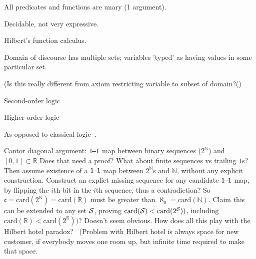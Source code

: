 All predicates and functions are unary 
(1 argument).~\cite{wiki:Monadic_predicate_calculus}

Decidable, not very expressive.

\label{sec:Many_sorted_first_order_models}

Hilbert's function calculus.~\cite{sep:logic_firstorder_emergence}

Domain of discourse has multiple sets;
variables 'typed' as having values in some particular 
set.~\cite{sep:modeltheory_fo}

(Is this really different from
axiom restricting variable to subset of domain?()


\label{sec:Second_order_logic}

Second-order logic~\cite{wiki:Second_order_logic,
wiki:Second_order_propositional_logic}

\label{sec:Higher_order_logic}

Higher-order logic~\cite{wiki:Higher_order_logic}


\setcounter{currentlevel}{\value{baseSectionLevel}}
\label{sec:Constructivism}

\cite{Feferman:2000,Diez:2002,sep:mathematics_constructive,
wiki:Constructivism_philosophy_of_mathematics}

As opposed to classical logic~\cite{wiki:Classical_logic}.

\label{sec:Feferman}
\cite{Feferman:2000}

\label{sec:Is_Cantor_Necessary}
\cite{Feferman1989CantorNecessary}

Cantor diagonal argument:
\hfill\break
$1{\!}{-}{\!}1$ map between binary sequences ($2^{\mathbb{N}}$)
and $[0,1]\subset\mathbb{R}$
Does that need a proof?
What about finite sequences vs trailing $1$s? 
\hfill\break
Then assume existence of a $1{\!}{-}{\!}1$  
map between $2^{\mathbb{N}}$s 
and $\mathbb{N}$,
without any explicit construction.
Construct an explict missing sequence 
for any candidate $1{\!}{-}{\!}1$ map,
by flipping the $i$th bit in the $i$th sequence,
thus a contradiction?
So $\mathfrak{c} = \mathrm{card}(2^{\mathbb{N}}) 
= \mathrm{card}(\mathbb{R})$ must be greater than 
$\aleph_0 = \mathrm{card}(\mathbb{N})$. 
\hfill\break
Claim this can be extended to any set $\mathcal{S}$,
proving $\mathrm{card}(\mathcal{S}) < \mathrm{card}(2^{\mathcal{S}}))$,
including $\mathrm{card}(\mathbb{R}) < \mathrm{card}(2^{\mathbb{R}}))$?
Doesn't seem obvious.
\hfill\break
How does all this play with 
the Hilbert hotel paradox?~\cite{wiki:Hilbert_hotel}
(Problem with Hilbert hotel is 
always space for new customer, if everybody moves one room up,
but infinite time required to make that space.

